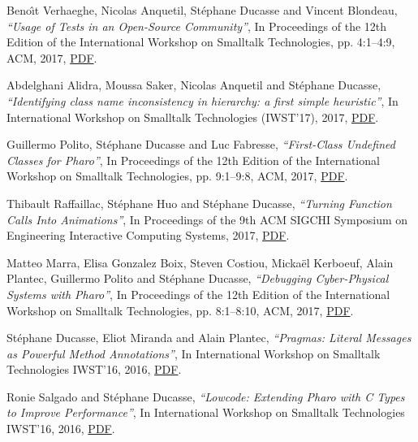 \documentclass{article}
\newcommand{\czauthors}[1]{#1}
\newcommand{\cztitle}[1]{\emph{``#1''}}
\newcommand{\czbooktitle}[1]{#1}
\begin{document}
\begin{itemize}
	\pub  \czauthors{Beno{\^\i}t Verhaeghe, Nicolas Anquetil, St\'ephane Ducasse and Vincent Blondeau},  \cztitle{Usage of Tests in an Open-Source Community},  In \czbooktitle{Proceedings of the 12th Edition of the International Workshop on Smalltalk Technologies}, pp. 4:1--4:9, ACM, 2017, \href{http://rmod-files.lille.inria.fr/Team/Texts/Papers/Verh17a-IWST-TestUsage.pdf}{PDF}.

	\pub  \czauthors{Abdelghani Alidra, Moussa Saker, Nicolas Anquetil and St\'ephane Ducasse},  \cztitle{Identifying class name inconsistency in hierarchy: a first simple heuristic},  In \czbooktitle{International Workshop on Smalltalk Technologies (IWST'17)}, 2017, \href{http://rmod-files.lille.inria.fr/Team/Texts/Papers/Alid17a-IdentifyingClassNames-IWST17.pdf}{PDF}.

	\pub  \czauthors{Guillermo Polito, St\'ephane Ducasse and Luc Fabresse},  \cztitle{First-Class Undefined Classes for Pharo},  In \czbooktitle{Proceedings of the 12th Edition of the International Workshop on Smalltalk Technologies}, pp. 9:1--9:8, ACM, 2017, \href{http://rmod-files.lille.inria.fr/Team/Texts/Papers/Poli17b-IWST-UndefinedClasses.pdf}{PDF}.

	\pub  \czauthors{Thibault Raffaillac, St\'ephane Huo and St\'ephane Ducasse},  \cztitle{Turning Function Calls Into Animations},  In \czbooktitle{Proceedings of the 9th ACM SIGCHI Symposium on Engineering Interactive Computing Systems}, 2017, \href{http://rmod-files.lille.inria.fr/Team/Texts/Papers/Raff17a-SIGCHI-Animations.pdf}{PDF}.

	\pub  \czauthors{Matteo Marra, Elisa Gonzalez Boix, Steven Costiou, Micka\"el Kerboeuf, Alain Plantec, Guillermo Polito and St\'ephane Ducasse},  \cztitle{Debugging Cyber-Physical Systems with Pharo},  In \czbooktitle{Proceedings of the 12th Edition of the International Workshop on Smalltalk Technologies}, pp. 8:1--8:10, ACM, 2017, \href{http://rmod-files.lille.inria.fr/Team/Texts/Papers/Mar17a-IWST-DebuggingIoT.pdf}{PDF}.

	\pub  \czauthors{St\'ephane Ducasse, Eliot Miranda and Alain Plantec},  \cztitle{Pragmas: Literal Messages as Powerful Method Annotations},  In \czbooktitle{International Workshop on Smalltalk Technologies {IWST'16}}, 2016, \href{http://rmod-files.lille.inria.fr/Team/Texts/Papers/Duca16a-Pragmas-IWST.pdf}{PDF}.

	\pub  \czauthors{Ronie Salgado and St\'ephane Ducasse},  \cztitle{{Lowcode: Extending Pharo with C Types to Improve Performance}},  In \czbooktitle{International Workshop on Smalltalk Technologies {IWST'16}}, 2016, \href{http://rmod-files.lille.inria.fr/Team/Texts/Papers/Salg16a-IWST16-Lowcode.pdf}{PDF}.


\end{itemize}
\end{document}
